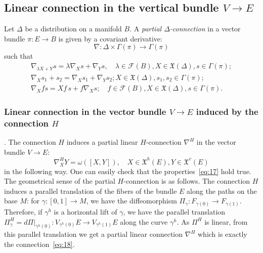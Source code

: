 \documentclass[12pt,letterpaper]{amsart}
\theoremstyle{definition}
\theoremstyle{plain}
\theoremstyle{remark}
\begin{document}
\subsection{Linear connection in the vertical bundle $V \to E$}
\label{subsec:3_2}
Let $\Delta$ be a distribution on a manifold $B$.
A \emph{partial $\Delta$-connection} in a vector bundle $\pi : E \to B$ is given by a covariant derivative:
\begin{equation*}
\nabla : \Delta \times \Gamma(\pi)\to \Gamma(\pi)
\end{equation*}
such that
\begin{equation}
\begin{array}{l}
\nabla_{\lambda X + Y} s = \lambda \nabla_X s + \nabla_Y s,
\quad \lambda \in \mathcal{F}(B), X \in \mathfrak{X}(\Delta), s \in \Gamma(\pi);
\\
\nabla_{X} s_1 + s_2 = \nabla_X s_1 + \nabla_Y s_2;
X \in \mathfrak{X}(\Delta), s_1, s_2 \in \Gamma(\pi);
\\
\nabla_{X} f s = Xf \, s + f \nabla_X s;
\quad f \in \mathcal{F}(B), X \in \mathfrak{X}(\Delta), s \in \Gamma(\pi).
\end{array}
\label{eq:17}
\end{equation}
\subsubsection{Linear connection in the vector bundle $V \to E$ induced by the connection $H$}.
\label{subsubsec:3_2_1}
The connection $H$ induces a partial linear $H$-connection $\nabla^H$ in the vector bundle $V \to E$:
\begin{equation}
\nabla^H_X Y = \omega( [X, Y] ), \quad X \in \mathfrak{X}^h(E), Y \in \mathfrak{X}^v(E)
\label{eq:18}
\end{equation}
in the following way.
One can easily check that the properties~\eqref{eq:17} hold true.
The geometrical sense of the partial $H$-connection is as follows.
The connection $H$ induces a parallel translation of the fibers of the bundle $E$ along the paths on the base $M$: for $\gamma : [0, 1] \to M$, we have the diffeomorphism $\Pi_\gamma : F_{\gamma(0)} \to F_{\gamma(1)}$.
Therefore, if $\gamma^h$ is a horizontal lift of $\gamma$, we have the parallel translation $\Pi^H_{\gamma} = \left.d\Pi\right|_{\gamma^h(0)} : V_{\gamma^h(0)}E \to V_{\gamma^h(1)}E$ along the curve $\gamma^h$.
As $\Pi^H$ is linear, from this parallel translation we get a partial linear connection $\nabla^H$ which is exactly the connection~\eqref{eq:18}.
\end{document}
